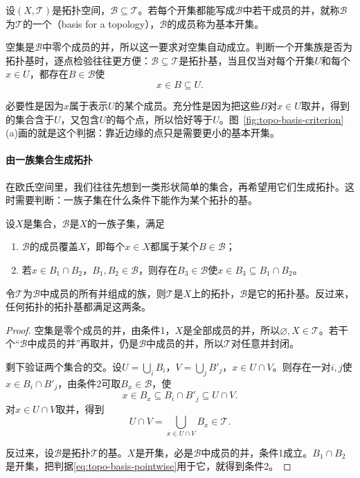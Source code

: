\begin{definition}[拓扑基]
\label{def:topo-basis}
设$(X,\mathcal T)$是拓扑空间，$\mathcal B\subseteq\mathcal T$。若每个开集都能写成$\mathcal B$中若干成员的并，就称$\mathcal B$为$\mathcal T$的一个（basis for a topology），$\mathcal B$的成员称为基本开集。
\end{definition}

空集是$\mathcal B$中零个成员的并，所以这一要求对空集自动成立。判断一个开集族是否为拓扑基时，逐点检验往往更方便：$\mathcal B\subseteq\mathcal T$是拓扑基，当且仅当对每个开集$U$和每个$x\in U$，都存在$B\in\mathcal B$使
\begin{equation}
 x\in B\subseteq U.
 \label{eq:topo-basis-pointwise}
\end{equation}

必要性是因为$x$属于表示$U$的某个成员。充分性是因为把这些$B$对$x\in U$取并，得到的集合含于$U$，又包含$U$的每个点，所以恰好等于$U$。图~\ref{fig:topo-basis-criterion}(a)画的就是这个判据：靠近边缘的点只是需要更小的基本开集。

\paragraph{由一族集合生成拓扑}
在欧氏空间里，我们往往先想到一类形状简单的集合，再希望用它们生成拓扑。这时需要判断：一族子集在什么条件下能作为某个拓扑的基。

\begin{theorem}[生成拓扑的基]
\label{thm:topo-basis-criterion}
设$X$是集合，$\mathcal B$是$X$的一族子集，满足
\begin{enumerate}
  \item $\mathcal B$的成员覆盖$X$，即每个$x\in X$都属于某个$B\in\mathcal B$；
  \item 若$x\in B_1\cap B_2$，$B_1,B_2\in\mathcal B$，则存在$B_3\in\mathcal B$使$x\in B_3\subseteq B_1\cap B_2$。
\end{enumerate}
令$\mathcal T$为$\mathcal B$中成员的所有并组成的族，则$\mathcal T$是$X$上的拓扑，$\mathcal B$是它的拓扑基。反过来，任何拓扑的拓扑基都满足这两条。
\end{theorem}
\begin{proof}
空集是零个成员的并，由条件1，$X$是全部成员的并，所以$\varnothing,X\in\mathcal T$。若干个“$\mathcal B$中成员的并”再取并，仍是$\mathcal B$中成员的并，所以$\mathcal T$对任意并封闭。

剩下验证两个集合的交。设$U=\bigcup_iB_i$，$V=\bigcup_jB'_j$，$x\in U\cap V$。则存在一对$i,j$使$x\in B_i\cap B'_j$，由条件2可取$B_x\in\mathcal B$，使
\[
 x\in B_x\subseteq B_i\cap B'_j\subseteq U\cap V.
\]
对$x\in U\cap V$取并，得到
\[
 U\cap V=\bigcup_{x\in U\cap V}B_x\in\mathcal T.
\]

反过来，设$\mathcal B$是拓扑$\mathcal T$的基。$X$是开集，必是$\mathcal B$中成员的并，条件1成立。$B_1\cap B_2$是开集，把判据\eqref{eq:topo-basis-pointwise}用于它，就得到条件2。
\end{proof}

